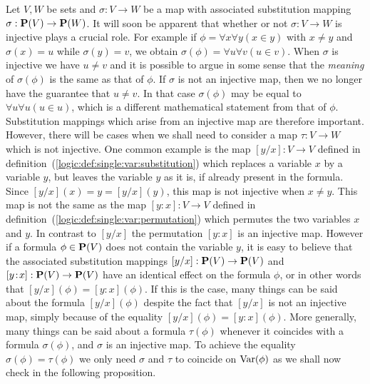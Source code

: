 Let $V,W$ be sets and $\sigma:V\to W$ be a map with associated
substitution mapping $\sigma:\mbox{${\bf P}(V)$}\to{\bf P}(W)$. It will soon be
apparent that whether or not $\sigma:V\to W$ is injective plays a
crucial role. For example if $\phi=\forall x\forall y(x\in y)$ with
$x\neq y$ and $\sigma(x)=u$ while $\sigma(y)=v$, we obtain
$\sigma(\phi)=\forall u\forall v(u\in v)$. When $\sigma$ is
injective we have $u\neq v$ and it is possible to argue in some
sense that the {\em meaning} of $\sigma(\phi)$ is the same as that
of $\phi$. If $\sigma$ is not an injective map, then we no longer
have the guarantee that $u\neq v$. In that case $\sigma(\phi)$ may
be equal to $\forall u\forall u(u\in u)$, which is a different
mathematical statement from that of $\phi$. Substitution mappings
which arise from an injective map are therefore important. However,
there will be cases when we shall need to consider a map $\tau:V\to
W$ which is not injective. One common example is the map $[y/x]:V\to
V$ defined in definition~(\ref{logic:def:single:var:substitution})
which replaces a variable $x$ by a variable $y$, but leaves the
variable $y$ as it is, if already present in the formula. Since
$[y/x](x)=y=[y/x](y)$, this map is not injective when $x\neq y$.
This map is not the same as the map $[y\!:\!x]:V\to V$ defined in
definition~(\ref{logic:def:single:var:permutation}) which permutes
the two variables $x$ and $y$. In contrast to $[y/x]$ the
permutation $[y:x]$ is an injective map. However if a formula
$\phi\in\mbox{${\bf P}(V)$}$ does not contain the variable $y$, it is easy to
believe that the associated substitution mappings $[y/x]:\mbox{${\bf P}(V)$}\to\mbox{${\bf P}(V)$}$
and $[y\!:\!x]:\mbox{${\bf P}(V)$}\to\mbox{${\bf P}(V)$}$ have an identical effect on the formula
$\phi$, or in other words that $[y/x](\phi)=[y\!:\!x](\phi)$. If
this is the case, many things can be said about the formula
$[y/x](\phi)$ despite the fact that $[y/x]$ is not an injective map,
simply because of the equality $[y/x](\phi)=[y\!:\!x](\phi)$. More
generally, many things can be said about a formula $\tau(\phi)$
whenever it coincides with a formula $\sigma(\phi)$, and $\sigma$ is
an injective map. To achieve the equality $\sigma(\phi)=\tau(\phi)$
we only need $\sigma$ and $\tau$ to coincide on $\mbox{\rm Var}(\phi)$ as we
shall now check in the following proposition.

